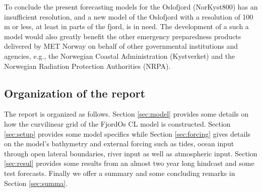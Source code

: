 To conclude the present forecasting models for the Oslofjord (NorKyst800) has an insufficient resolution, and a new model of the Oslofjord with a resolution of 100 m or less, at least in parts of the fjord, is in need. The development of a such a model would also greatly benefit the other emergency preparedness products delivered by MET Norway on behalf of other governmental institutions and agencies, e.g., the Norwegian Coastal Administration (Kystverket) and the Norwegian Radiation Protection Authorities (NRPA).   


\subsection{Organization of the report}
The report is organized as follows. Section \ref{sec:model} provides some details on how the curvilinear grid of the FjordOs CL model is constructed. Section \ref{sec:setup} provides some model specifics while Section \ref{sec:forcing} gives details on the model's bathymetry and external forcing such as tides, ocean input through open lateral boundaries, river input as well as atmospheric input. Section \ref{sec:resul} provides some results from an almost two year long hindcast and some test forecasts. Finally we offer a summary and some concluding remarks in Section \ref{sec:summa}. 
